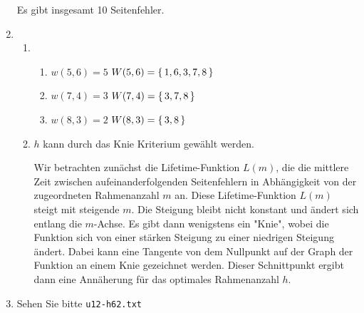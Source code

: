 \begin{enumerate}[label={Aufgabe H\arabic*},start=60]
        Es gibt insgesamt 10 Seitenfehler.
    \item 
        \begin{enumerate}
            \item 
                \begin{enumerate}[label={(\roman*)}]
                    \item $w(5,6) = 5$ \hspace{1cm} $W(5,6) = \left\{\,1, 6, 3, 7, 8\,\right\}$ 
                    \item $w(7,4) = 3$ \hspace{1cm} $W(7,4) = \left\{\,3, 7, 8\,\right\}$
                    \item $w(8,3) = 2$ \hspace{1cm} $W(8,3) = \left\{\,3, 8\,\right\}$
                \end{enumerate}
            \item $h$ kann durch das Knie Kriterium gewählt werden. 

                Wir betrachten zunächst die Lifetime-Funktion $L(m)$, die die mittlere Zeit zwischen aufeinanderfolgenden Seitenfehlern in Abhängigkeit von der zugeordneten Rahmenanzahl $m$ an. Diese Lifetime-Funktion $L(m)$ steigt mit steigende $m$. Die Steigung bleibt nicht konstant und ändert sich entlang die $m$-Achse. Es gibt dann wenigstens ein "Knie", wobei die Funktion sich von einer stärken Steigung zu einer niedrigen Steigung ändert. Dabei kann eine Tangente von dem Nullpunkt auf der Graph der Funktion an einem Knie gezeichnet werden. Dieser Schnittpunkt ergibt dann eine Annäherung für das optimales Rahmenanzahl $h$.
        \end{enumerate}
    \item Sehen Sie bitte \texttt{u12-h62.txt}
\end{enumerate}